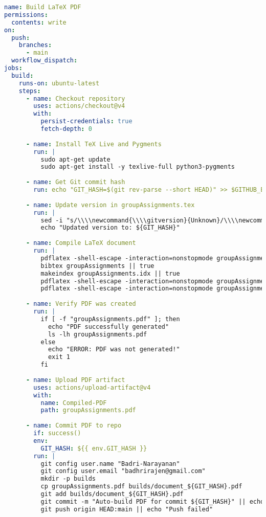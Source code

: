 \begin{lstlisting}[language=yaml]
name: Build LaTeX PDF
permissions:
  contents: write
on:
  push:
    branches:
      - main
  workflow_dispatch:
jobs:
  build:
    runs-on: ubuntu-latest
    steps:
      - name: Checkout repository
        uses: actions/checkout@v4
        with:
          persist-credentials: true
          fetch-depth: 0
      
      - name: Install TeX Live and Pygments
        run: |
          sudo apt-get update
          sudo apt-get install -y texlive-full python3-pygments
      
      - name: Get Git commit hash
        run: echo "GIT_HASH=$(git rev-parse --short HEAD)" >> $GITHUB_ENV
      
      - name: Update version in groupAssignments.tex
        run: |
          sed -i "s/\\\\newcommand{\\\\gitversion}{Unknown}/\\\\newcommand{\\\\gitversion}{${GIT_HASH}}/" groupAssignments.tex
          echo "Updated version to: ${GIT_HASH}"
      
      - name: Compile LaTeX document
        run: |
          pdflatex -shell-escape -interaction=nonstopmode groupAssignments.tex || true
          bibtex groupAssignments || true
          makeindex groupAssignments.idx || true
          pdflatex -shell-escape -interaction=nonstopmode groupAssignments.tex || true
          pdflatex -shell-escape -interaction=nonstopmode groupAssignments.tex || true
      
      - name: Verify PDF was created
        run: |
          if [ -f "groupAssignments.pdf" ]; then
            echo "PDF successfully generated"
            ls -lh groupAssignments.pdf
          else
            echo "ERROR: PDF was not generated!"
            exit 1
          fi
      
      - name: Upload PDF artifact
        uses: actions/upload-artifact@v4
        with:
          name: Compiled-PDF
          path: groupAssignments.pdf
      
      - name: Commit PDF to repo
        if: success()
        env:
          GIT_HASH: ${{ env.GIT_HASH }}
        run: |
          git config user.name "Badri-Narayanan"
          git config user.email "badhrirajen@gmail.com"
          mkdir -p builds
          cp groupAssignments.pdf builds/document_${GIT_HASH}.pdf
          git add builds/document_${GIT_HASH}.pdf
          git commit -m "Auto-build PDF for commit ${GIT_HASH}" || echo "No changes to commit"
          git push origin HEAD:main || echo "Push failed"
\end{lstlisting}

